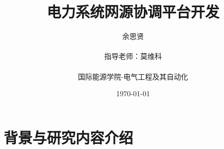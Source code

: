 \documentclass[aspectratio=43, 10pt, utf8, mathserif]{beamer}
\begin{document}
	
	
	\title{电力系统网源协调平台开发}
	
	\author[余思贤]{余思贤\\\ 
		\\ 
		指导老师：莫维科\\\ 
		\\
		国际能源学院-电气工程及其自动化
		\quad \\ \vspace{0.5cm}  \quad{}}
	\institute[ ]
	{
		
	}
	\date{\today}
	\begin{frame}
		\titlepage
	\end{frame}
	
	
	\section{背景与研究内容介绍}
	
\end{document}
